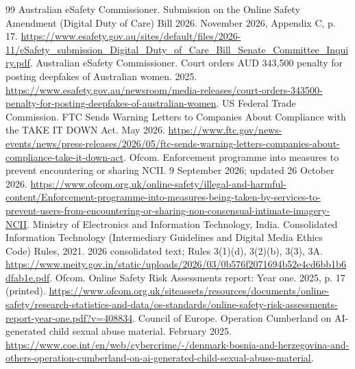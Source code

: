 \documentclass[10pt,a4paper]{article}
\begin{document}
\begin{thebibliography}{99}
 Australian eSafety Commissioner. Submission on the Online Safety Amendment (Digital Duty of Care) Bill 2026. November 2026, Appendix C, p. 17. \url{https://www.esafety.gov.au/sites/default/files/2026-11/eSafety_submission_Digital_Duty_of_Care_Bill_Senate_Committee_Inquiry.pdf}.
 Australian eSafety Commissioner. Court orders AUD 343,500 penalty for posting deepfakes of Australian women. 2025. \url{https://www.esafety.gov.au/newsroom/media-releases/court-orders-343500-penalty-for-posting-deepfakes-of-australian-women}.
 US Federal Trade Commission. FTC Sends Warning Letters to Companies About Compliance with the TAKE IT DOWN Act. May 2026. \url{https://www.ftc.gov/news-events/news/press-releases/2026/05/ftc-sends-warning-letters-companies-about-compliance-take-it-down-act}.
 Ofcom. Enforcement programme into measures to prevent encountering or sharing NCII. 9 September 2026; updated 26 October 2026. \url{https://www.ofcom.org.uk/online-safety/illegal-and-harmful-content/Enforcement-programme-into-measures-being-taken-by-services-to-prevent-users-from-encountering-or-sharing-non-consensual-intimate-imagery-NCII}.
 Ministry of Electronics and Information Technology, India. Consolidated Information Technology (Intermediary Guidelines and Digital Media Ethics Code) Rules, 2021. 2026 consolidated text; Rules 3(1)(d), 3(2)(b), 3(3), 3A. \url{https://www.meity.gov.in/static/uploads/2026/03/0b576f2071694b52e4cd6bb1b6dfab1e.pdf}.
 Ofcom. Online Safety Risk Assessments report: Year one. 2025, p. 17 (printed). \url{https://www.ofcom.org.uk/siteassets/resources/documents/online-safety/research-statistics-and-data/os-standards/online-safety-risk-assessments-report-year-one.pdf?v=408834}.
 Council of Europe. Operation Cumberland on AI-generated child sexual abuse material. February 2025. \url{https://www.coe.int/en/web/cybercrime/-/denmark-bosnia-and-herzegovina-and-others-operation-cumberland-on-ai-generated-child-sexual-abuse-material}.
\end{thebibliography}
\end{document}
